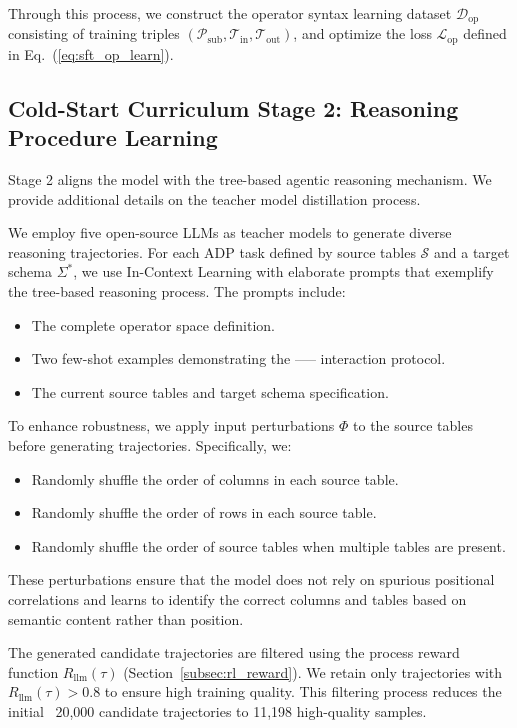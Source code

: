 Through this process, we construct the operator syntax learning dataset $\mathcal{D}_{\text{op}}$ consisting of training triples $(\mathcal{P}_{\text{sub}}, \mathcal{T}_{\text{in}}, \mathcal{T}_{\text{out}})$, and optimize the loss $\mathcal{L}_{\text{op}}$ defined in Eq.~(\ref{eq:sft_op_learn}).

\subsection{Cold-Start Curriculum Stage 2: Reasoning Procedure Learning}
\label{subsec:appendix_stage2}

Stage 2 aligns the model with the tree-based agentic reasoning mechanism. We provide additional details on the teacher model distillation process.

We employ five open-source LLMs as teacher models to generate diverse reasoning trajectories. For each ADP task defined by source tables $\mathcal{S}$ and a target schema $\Sigma^\ast$, we use In-Context Learning with elaborate prompts that exemplify the tree-based reasoning process. The prompts include:
\begin{itemize}[leftmargin=*]
    \item The complete operator space definition.
    \item Two few-shot examples demonstrating the ------ interaction protocol.
    \item The current source tables and target schema specification.
\end{itemize}

To enhance robustness, we apply input perturbations $\Phi$ to the source tables before generating trajectories. Specifically, we:
\begin{itemize}[leftmargin=*]
    \item Randomly shuffle the order of columns in each source table.
    \item Randomly shuffle the order of rows in each source table.
    \item Randomly shuffle the order of source tables when multiple tables are present.
\end{itemize}
These perturbations ensure that the model does not rely on spurious positional correlations and learns to identify the correct columns and tables based on semantic content rather than position.

The generated candidate trajectories are filtered using the process reward function $R_{\text{llm}}(\tau)$ (Section~\ref{subsec:rl_reward}). We retain only trajectories with $R_{\text{llm}}(\tau) > 0.8$ to ensure high training quality. This filtering process reduces the initial ~20,000 candidate trajectories to 11,198 high-quality samples.

